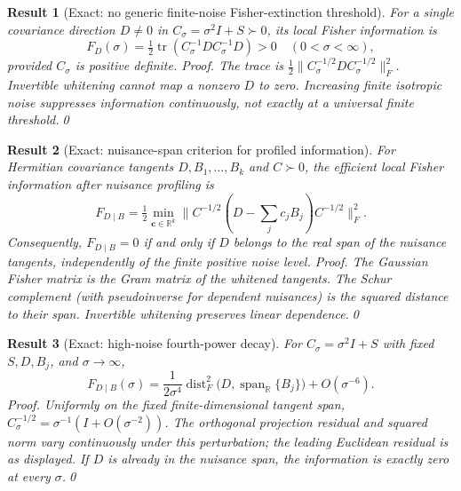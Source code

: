 \documentclass[aps,prd,onecolumn,notitlepage,groupedaddress,11pt]{revtex4-2}
\newtheorem{result}{Result}
\begin{document}
\begin{result}[\textsf{Exact}: no generic finite-noise Fisher-extinction threshold]\label{new:223}
For a single covariance direction $D\ne0$ in $C_\sigma=\sigma^2I+S\succ0$, its local Fisher information is
\begin{equation}\label{eq:post223}
F_D(\sigma)=\tfrac12\operatorname{tr}(C_\sigma^{-1}DC_\sigma^{-1}D)>0
\quad(0<\sigma<\infty),
\end{equation}
provided $C_\sigma$ is positive definite. \textit{Proof.} The trace is $\frac12\|C_\sigma^{-1/2}DC_\sigma^{-1/2}\|_F^2$. Invertible whitening cannot map a nonzero $D$ to zero. Increasing finite isotropic noise suppresses information continuously, not exactly at a universal finite threshold.\qed
\end{result}

\begin{result}[\textsf{Exact}: nuisance-span criterion for profiled information]\label{new:224}
For Hermitian covariance tangents $D,B_1,\ldots,B_k$ and $C\succ0$, the efficient local Fisher information after nuisance profiling is
\begin{equation}\label{eq:post224}
F_{D\mid B}=\tfrac12\min_{\boldsymbol c\in\mathbb R^k}
\big\|C^{-1/2}(D-\textstyle\sum_jc_jB_j)C^{-1/2}\big\|_F^2.
\end{equation}
Consequently, $F_{D\mid B}=0$ if and only if $D$ belongs to the \emph{real} span of the nuisance tangents, independently of the finite positive noise level. \textit{Proof.} The Gaussian Fisher matrix is the Gram matrix of the whitened tangents. The Schur complement (with pseudoinverse for dependent nuisances) is the squared distance to their span. Invertible whitening preserves linear dependence.\qed
\end{result}

\begin{result}[\textsf{Exact}: high-noise fourth-power decay]\label{new:225}
For $C_\sigma=\sigma^2I+S$ with fixed $S,D,B_j$, and $\sigma\to\infty$,
\begin{equation}\label{eq:post225}
F_{D\mid B}(\sigma)=\frac1{2\sigma^4}\operatorname{dist}_F^2
\!\bigl(D,\operatorname{span}_{\mathbb R}\{B_j\}\bigr)+O(\sigma^{-6}).
\end{equation}
\textit{Proof.} Uniformly on the fixed finite-dimensional tangent span, $C_\sigma^{-1/2}=\sigma^{-1}(I+O(\sigma^{-2}))$. The orthogonal projection residual and squared norm vary continuously under this perturbation; the leading Euclidean residual is as displayed. If $D$ is already in the nuisance span, the information is exactly zero at every $\sigma$.\qed
\end{result}
\end{document}
